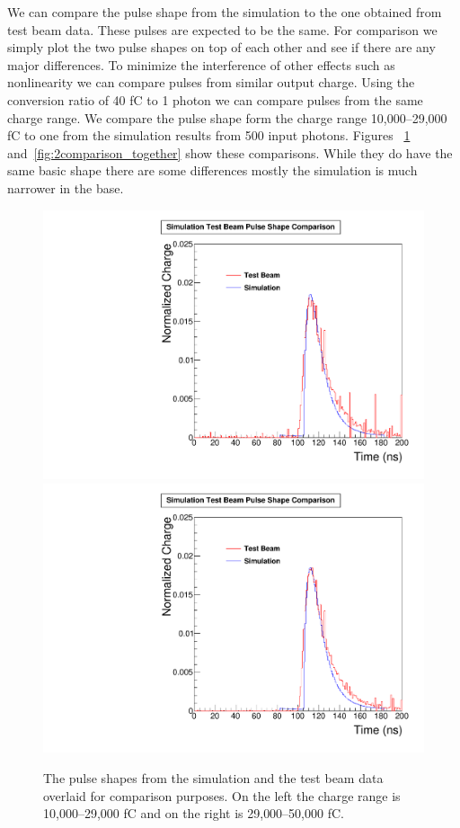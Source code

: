 We can compare the pulse shape from the simulation to the one obtained from test beam data. These pulses are expected to be the same. For comparison we simply plot the two pulse shapes on top of each other and see if there are any major differences. To minimize the interference of other effects such as nonlinearity we can compare pulses from similar output charge. Using the conversion ratio of 40 fC to 1 photon we can compare pulses from the same charge range. We compare the pulse shape form the charge range 10,000--29,000 fC to one from the simulation results from 500 input photons. Figures ~\ref{fig:1comparison_together} and~\ref{fig:2comparison_together} show these comparisons. While they do have the same basic shape there are some differences mostly the simulation is much narrower in the base.

\begin{figure}
\centering
\includegraphics[width=0.495\linewidth]{Figures/10Comparison.pdf}
\includegraphics[width=0.495\linewidth]{Figures/29Comparison.pdf}
\caption{The pulse shapes from the simulation and the test beam data overlaid for comparison purposes. On the left the charge range is 10,000--29,000 fC and on the right is 29,000--50,000 fC.}
\label{fig:1comparison_together}
\end{figure}

